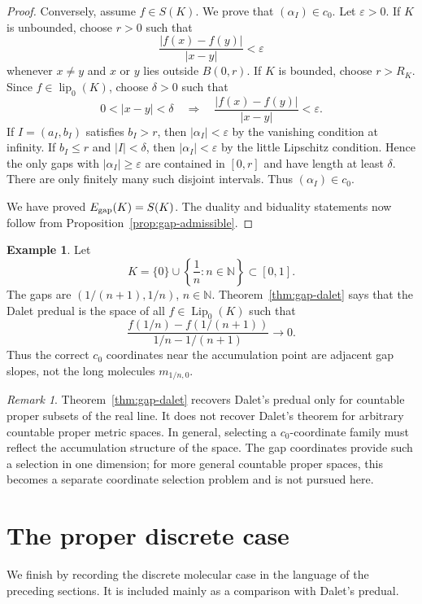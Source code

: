 \documentclass[11pt]{amsart}
\theoremstyle{plain}
\theoremstyle{definition}
\newtheorem{example}[theorem]{Example}
\theoremstyle{remark}
\newtheorem{remark}[theorem]{Remark}
\newcommand{\Lip}{\operatorname{Lip}}
\newcommand{\lip}{\operatorname{lip}}
\newcommand{\N}{\mathbb N}
\begin{document}
\begin{proof}
Conversely, assume $f\in S(K)$. We prove that $(\alpha_I)\in c_0$. Let
$\varepsilon>0$. If $K$ is unbounded, choose $r>0$ such that
\[
        \frac{|f(x)-f(y)|}{|x-y|}<\varepsilon
\]
whenever $x\ne y$ and $x$ or $y$ lies outside $B(0,r)$. If $K$ is bounded,
choose $r>R_K$. Since $f\in\lip_0(K)$, choose $\delta>0$ such that
\[
        0<|x-y|<\delta
        \quad\Longrightarrow\quad
        \frac{|f(x)-f(y)|}{|x-y|}<\varepsilon.
\]
If $I=(a_I,b_I)$ satisfies $b_I>r$, then $|\alpha_I|<\varepsilon$ by the
vanishing condition at infinity. If $b_I\le r$ and $|I|<\delta$, then
$|\alpha_I|<\varepsilon$ by the little Lipschitz condition. Hence the only
gaps with $|\alpha_I|\ge\varepsilon$ are contained in $[0,r]$ and have
length at least $\delta$. There are only finitely many such disjoint
intervals. Thus $(\alpha_I)\in c_0$.

We have proved $E_{\rm gap}(K)=S(K)$. The duality and biduality statements
now follow from Proposition~\ref{prop:gap-admissible}.
\end{proof}

\begin{example}
Let
\[
        K=\{0\}\cup\left\{\frac1n:n\in\N\right\}
        \subset[0,1].
\]
The gaps are $(1/(n+1),1/n)$, $n\in\N$. Theorem~\ref{thm:gap-dalet} says
that the Dalet predual is the space of all $f\in\Lip_0(K)$ such that
\[
        \frac{f(1/n)-f(1/(n+1))}{1/n-1/(n+1)}\longrightarrow 0.
\]
Thus the correct $c_0$ coordinates near the accumulation point are adjacent
gap slopes, not the long molecules $m_{1/n,0}$.
\end{example}

\begin{remark}
Theorem~\ref{thm:gap-dalet} recovers Dalet's predual only for countable
proper subsets of the real line. It does not recover Dalet's theorem for
arbitrary countable proper metric spaces. In general, selecting a
$c_0$-coordinate family must reflect the accumulation structure of the
space. The gap coordinates provide such a selection in one dimension; for
more general countable proper spaces, this becomes a separate coordinate
selection problem and is not pursued here.
\end{remark}

\section{The proper discrete case}

We finish by recording the discrete molecular case in the language of the
preceding sections. It is included mainly as a comparison with Dalet's
predual.
\end{document}
